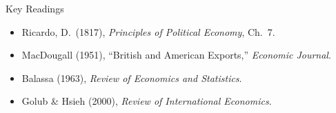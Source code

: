 \documentclass[aspectratio=169]{beamer}
\begin{document}
\begin{frame}{Key Readings}




\begin{itemize}\footnotesize
  \item Ricardo, D.\ (1817),
        \textit{Principles of Political Economy},
        Ch.~7.
  \item MacDougall (1951), ``British and American
        Exports,'' \textit{Economic Journal}.
  \item Balassa (1963),
        \textit{Review of Economics and Statistics}.
  \item Golub \& Hsieh (2000),
        \textit{Review of International Economics}.
\end{itemize}


\end{frame}
\end{document}
